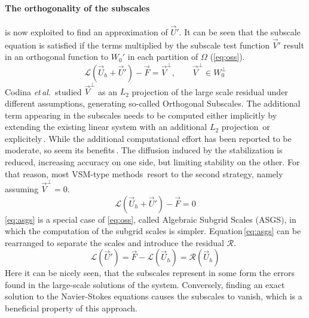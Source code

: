 \paragraph{The orthogonality of the subscales} is now exploited to find an approximation of $\vec{U}'$. It can be seen that the subscale equation is satisfied if the terms multiplied by the subscale test function $\vec{V}'$ result in an orthogonal function to $W_0'$ in each partition of $\Omega$ (\autoref{eq:oss}).
\begin{equation}
	\mathcal{L}(\vec{U}_h + \vec{U}') - \vec{F} = \vec{V}^\bot, \qquad \vec{V}^\bot \in W_0^\bot
	\label{eq:oss}
\end{equation}
Codina \textit{et\,al.}\,\cite{Codina2002, Codina2004, Codina2008} studied $\vec{V}^\bot$ as an $L_2$ projection of the large scale residual under different assumptions, generating so-called Orthogonal Subscales. The additional term appearing in the subscales needs to be computed either implicitly by extending the existing linear system with an additional $L_2$ projection\,\cite{Codina2008} or explicitely\,\cite{Codina2002}. While the additional computational effort has been reported to be moderate, so seem its benefits\,\cite{Codina2004, Codina2008}. The diffusion induced by the stabilization is reduced, increasing accuracy on one side, but limiting stability on the other. For that reason, most VSM-type methods\,\cite{Bazilevs2007, Brooks1982, Hughes2017, Tezduyar2000} resort to the second strategy, namely assuming $\vec{V}^\bot = 0$.
\begin{equation}
	\mathcal{L}(\vec{U}_h + \vec{U}') - \vec{F} = 0
	\label{eq:asgs}
\end{equation}
\autoref{eq:asgs} is a special case of \autoref{eq:oss}, called Algebraic Subgrid Scales (ASGS), in which the computation of the subgrid scales is simpler. Equation\,\ref{eq:asgs} can be rearranged to separate the scales and introduce the residual $\mathcal{R}$.
\begin{equation*}
	\mathcal{L}(\vec{U}') = \vec{F} - \mathcal{L}(\vec{U}_h) = \mathcal{R}(\vec{U}_h)
\end{equation*}
Here it can be nicely seen, that the subscales represent in some form the errors found in the large-scale solutions of the system. Conversely, finding an exact solution to the Navier-Stokes equations causes the subscales to vanish, which is a beneficial property of this approach.

